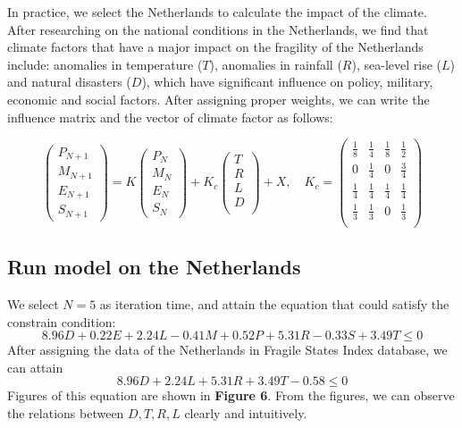 \documentclass{mcmthesis}
\begin{document}
	In practice, we select the Netherlands to calculate the impact of the climate. After researching on the national conditions in the Netherlands, we find that climate factors that have a major impact on the fragility of the Netherlands include: anomalies in temperature ($T$), anomalies in rainfall ($R$), sea-level rise ($L$) and natural disasters ($D$), which have significant influence on policy, military, economic and social factors. After assigning proper weights, we can write the influence matrix and the vector of climate factor as follows:
	\begin{spacing}{1.5}
	$$
	\left(
	\begin{matrix}
	P_{N+1} \\ M_{N+1} \\ E_{N+1} \\ S_{N+1}
	\end{matrix}
	\right) 
	= 
	K 
	\left(
	\begin{matrix}
	P_N \\ M_N \\ E_N \\ S_N
	\end{matrix}
	\right) 
	+
	K_c
	\left(
	\begin{matrix}
	T \\ R \\ L \\ D \\
	\end{matrix}
	\right)
	+ X
	, \quad
	K_c = 
	\left(
	\begin{matrix}
		\frac{1}{8} & \frac{1}{4} & \frac{1}{8} & \frac{1}{2} \\
		0 & \frac{1}{4} & 0 & \frac{3}{4} \\
		\frac{1}{4} & \frac{1}{4} & \frac{1}{4} & \frac{1}{4} \\
		\frac{1}{3} & \frac{1}{3} & 0 & \frac{1}{3} \\
	\end{matrix}
	\right)
	$$
	\end{spacing}

	\subsection{Run model on the Netherlands}
	We select $N = 5$ as iteration time, and attain the equation that could satisfy the constrain condition:
	$$
	8.96D + 0.22E + 2.24L - 0.41M + 0.52P + 5.31R - 0.33S + 3.49T\leq0
	$$
	After assigning the data of the Netherlands in Fragile States Index database, we can attain
	$$
	8.96D + 2.24L + 5.31R + 3.49T - 0.58\leq0
	$$
	Figures of this equation are shown in \textbf{Figure 6}. From the figures, we can observe the relations between $D,T,R,L$ clearly and intuitively.
	
\end{document}
